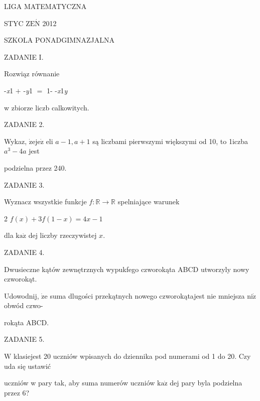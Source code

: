 \documentclass[a4paper,12pt]{article}
\begin{document}
LIGA MATEMATYCZNA

STYC Z$\mathrm{E}\acute{\mathrm{N}}$ 2012

SZKOLA PONADGIMNAZJALNA

ZADANIE I.

Rozwiąz równanie

-{\it x}1 $+$ -{\it y}1 $=$ 1- -{\it x}1{\it y}

w zbiorze liczb calkowitych.

ZADANIE 2.

Wykaz, $\dot{\mathrm{z}}\mathrm{e}\mathrm{j}\mathrm{e}\dot{\mathrm{z}}$ eli $a-1, a+1$ są liczbami pierwszymi większymi od 10, to 1iczba $a^{3}-4a$ jest

podzielna przez 240.

ZADANIE 3.

Wyznacz wszystkie funkcje $f:\mathbb{R}\rightarrow \mathbb{R}$ spelniające warunek

2 $f(x)+3f(1-x)=4x-1$

dla $\mathrm{k}\mathrm{a}\dot{\mathrm{z}}$ dej liczby rzeczywistej $x.$

ZADANIE 4.

Dwusieczne kątów zewnętrznych wypukfego czworokąta ABCD utworzyly nowy czworokąt.

Udowodnij, $\dot{\mathrm{z}}\mathrm{e}$ suma dlugości przekątnych nowego czworokątajest nie mniejsza $\mathrm{n}\mathrm{i}\dot{\mathrm{z}}$ obwód czwo-

rokąta ABCD.

ZADANIE 5.

$\mathrm{W}$ klasiejest 20 uczniów wpisanych do dziennika pod numerami od 1 do 20. Czy uda się ustawić

uczniów w pary tak, aby suma numerów uczniów $\mathrm{k}\mathrm{a}\dot{\mathrm{z}}$ dej pary byla podzielna przez 6?
\end{document}
